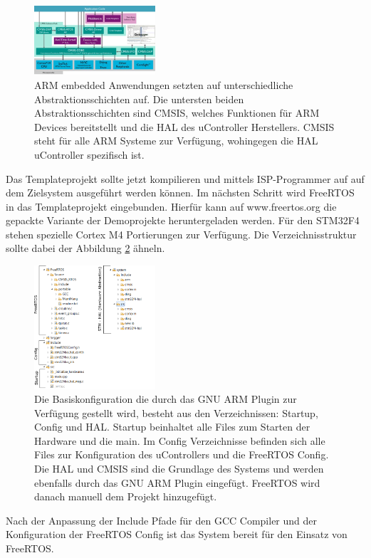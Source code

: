 \begin{figure}[htb]
	\centering
		\includegraphics[width=0.4\textwidth]{Pictures/Einrichtung/CMSISv4_small.jpg}
	\caption{ARM embedded Anwendungen setzten auf unterschiedliche Abstraktionsschichten auf. Die untersten beiden Abstraktionsschichten sind CMSIS, welches Funktionen für ARM Devices bereitstellt und die HAL des uController Herstellers. CMSIS steht für alle ARM Systeme zur Verfügung, wohingegen die HAL uController spezifisch ist. }
	\label{fig:CMSIS}
\end{figure}
Das Templateprojekt sollte jetzt kompilieren und mittels ISP-Programmer auf auf dem Zielsystem ausgeführt werden können.
Im nächsten Schritt wird FreeRTOS in das Templateprojekt eingebunden. Hierfür kann auf www.freertos.org die gepackte Variante der Demoprojekte heruntergeladen werden. Für den STM32F4 stehen spezielle Cortex M4 Portierungen zur Verfügung. Die Verzeichnisstruktur sollte dabei der Abbildung \ref{fig:SourceTree} ähneln.
\begin{figure}[htb]
	\centering
		\includegraphics[width=0.4\textwidth]{Pictures/Einrichtung/sourceTree.png}
	\caption{Die Basiskonfiguration die durch das GNU ARM Plugin zur Verfügung gestellt wird, besteht aus den Verzeichnissen: Startup, Config und HAL. Startup beinhaltet alle Files zum Starten der Hardware und die main. Im Config Verzeichnisse befinden sich alle Files zur Konfiguration des uControllers und die FreeRTOS Config. Die HAL und CMSIS sind die Grundlage des Systems und werden ebenfalls durch das GNU ARM Plugin eingefügt. FreeRTOS wird danach manuell dem Projekt hinzugefügt.}
	\label{fig:SourceTree}
\end{figure}
Nach der Anpassung der Include Pfade für den GCC Compiler und der Konfiguration der FreeRTOS Config ist das System bereit für den Einsatz von FreeRTOS.